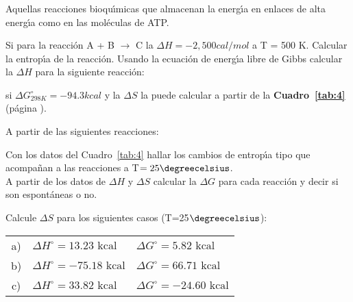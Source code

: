 \subsubsection{} Aquellas reacciones
bioqu\'{\i}micas que almacenan la energ\'{\i}a en enlaces de alta energ\'{\i}a como en las
mol\'eculas de ATP.

\newpage
\begin{exercises}

\exer Si para la reacci\'on A + B
$\longrightarrow$ C la
$\Delta H = -2,500 cal/mol$ a   T = 500 K. Calcular la entrop\'{\i}a de la reacci\'on.
\exer Usando la ecuaci\'on de energ\'{\i}a libre de
Gibbs calcular la
$\Delta H$ para la si\-guiente reacci\'on:

\hskip 1.2in \vskip 0.2in

si $\Delta G^\circ_{298K} = -94.3 kcal$ y la $\Delta S$ la puede calcular a partir de la
\textbf{Cuadro~\ref{tab:4}} (p\'agina \pageref{tab:4}).

\exer A partir de las siguientes reacciones:
 \subexer  Con los datos del Cuadro~\ref{tab:4}  hallar los cambios de entrop\'{\i}a tipo que acompa\~nan a las reacciones
 a T$= 25\degreecelsius$.\\
\subexer A partir de los datos de $\Delta H$ y $\Delta S$
calcular la $\Delta G$ para cada reacci\'on y decir si son espont\'aneas o no.
 
\exer Calcule $\Delta S$ para los siguientes casos
(T=25$\degreecelsius$):\\
\begin{tabular}{cll}
a)&$\Delta H^\circ = 13.23 \textrm{ kcal}$ &$\Delta G^\circ=5.82\textrm{ kcal}$\\
 b)&$\Delta H^\circ = -75.18 \textrm{ kcal}$ &$\Delta G^\circ=66.71 \textrm{ kcal}$\\
c)&$\Delta H^\circ = 33.82 \textrm{ kcal}$&$\Delta G^\circ=-24.60 \textrm{ kcal}$\\
\end{tabular}
\end{exercises}


